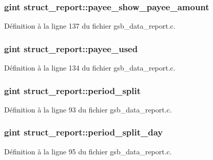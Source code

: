 \subsubsection[{payee\_\-show\_\-payee\_\-amount}]{\setlength{\rightskip}{0pt plus 5cm}gint {\bf struct\_\-report::payee\_\-show\_\-payee\_\-amount}}\label{structstruct__report_a728b3769d13f70bf831b051938ef6b30}


Définition à la ligne 137 du fichier gsb\_\-data\_\-report.c.

\subsubsection[{payee\_\-used}]{\setlength{\rightskip}{0pt plus 5cm}gint {\bf struct\_\-report::payee\_\-used}}\label{structstruct__report_a429990fe8900a47a9857e06f4dbdf966}


Définition à la ligne 134 du fichier gsb\_\-data\_\-report.c.

\subsubsection[{period\_\-split}]{\setlength{\rightskip}{0pt plus 5cm}gint {\bf struct\_\-report::period\_\-split}}\label{structstruct__report_a441f0a79a3e2bc7c88d4b834280fe8d5}


Définition à la ligne 93 du fichier gsb\_\-data\_\-report.c.

\subsubsection[{period\_\-split\_\-day}]{\setlength{\rightskip}{0pt plus 5cm}gint {\bf struct\_\-report::period\_\-split\_\-day}}\label{structstruct__report_aaf955dd4926b6b9429eb9418639a5ff6}


Définition à la ligne 95 du fichier gsb\_\-data\_\-report.c.

